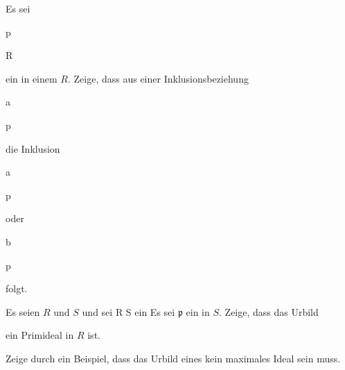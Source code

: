 {


Es sei


\mavergleichskette


{\vergleichskette


{ {\mathfrak p}
}


{ \subseteq }{ R
}


{  }{
}


{    }{
}


{   }{
}


}
{}{}{}
ein
in einem
$R$. Zeige, dass aus einer Inklusionsbeziehung


\mavergleichskettedisp


{\vergleichskette


{ {\mathfrak a} 
}


{ \subseteq} { {\mathfrak p}
}


{ } {
}


{ } {
}


{ } {
}


}
{}{}{}
die Inklusion


\mavergleichskette


{\vergleichskette


{ {\mathfrak a}
}


{ \subseteq }{ {\mathfrak p}
}


{  }{
}


{    }{
}


{   }{
}


}
{}{}{}
oder


\mavergleichskette


{\vergleichskette


{ {\mathfrak b}
}


{ \subseteq }{ {\mathfrak p}
}


{  }{
}


{    }{
}


{   }{
}


}
{}{}{}
folgt.


}


{} {}




{}


{


Es seien $R$ und $S$
und sei
\maabb {\varphi} { R } { S
} {}
ein
Es sei ${\mathfrak p}$ ein
in $S$. Zeige, dass das Urbild


 ein Primideal in $R$ ist.


Zeige durch ein Beispiel, dass das Urbild eines
kein maximales Ideal sein muss.


}


